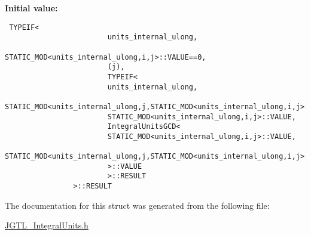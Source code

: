 \textbf{Initial value:}

\begin{Code}\begin{verbatim} TYPEIF< 
                        units_internal_ulong,
                        STATIC_MOD<units_internal_ulong,i,j>::VALUE==0, 
                        (j), 
                        TYPEIF< 
                        units_internal_ulong,
                        STATIC_MOD<units_internal_ulong,j,STATIC_MOD<units_internal_ulong,i,j>::VALUE>::VALUE==0,
                        STATIC_MOD<units_internal_ulong,i,j>::VALUE,
                        IntegralUnitsGCD<
                        STATIC_MOD<units_internal_ulong,i,j>::VALUE,
                        STATIC_MOD<units_internal_ulong,j,STATIC_MOD<units_internal_ulong,i,j>::VALUE>::VALUE
                        >::VALUE
                        >::RESULT 
                >::RESULT
\end{verbatim}\end{Code}


The documentation for this struct was generated from the following file:\begin{CompactItemize}
\item 
\hyperlink{_j_g_t_l___integral_units_8h}{JGTL\_\-Integral\-Units.h}\end{CompactItemize}
